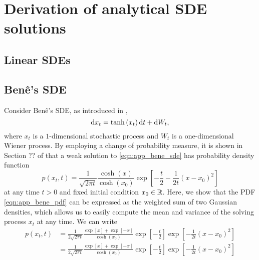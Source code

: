 \chapter{Derivation of analytical SDE solutions}



\section{Linear SDEs}\label{app:linear_sde_sols}


\section{Ben\^e's SDE}\label{app:bene_calculations}
Consider Ben\^e's SDE, as introduced in ,
\begin{equation}\label{eqn:app_bene_sde}
	\sde{x_t}{\tanh\left(x_t\right)}{},
\end{equation}
where \(x_t\) is a \(1\)-dimensional stochastic process and \(W_t\) is a one-dimensional Wiener process.
By employing a change of probability measure, it is shown in Section ?? of \citet{SarkkaSolin_2019_AppliedStochasticDifferential} that a weak solution to \eqref{eqn:app_bene_sde} has probability density function
\begin{equation}\label{eqn:app_bene_pdf}
	p\left(x_t, t\right) = \frac{1}{\sqrt{2\pi t}} \frac{\cosh\left(x\right)}{\cosh\left(x_0\right)}\exp\left[-\frac{t}{2} - \frac{1}{2t}\left(x - x_0\right)^2\right]
\end{equation}
at any time \(t > 0\) and fixed initial condition \(x_0 \in \mathbb{R}\).
Here, we show that the PDF \eqref{eqn:app_bene_pdf} can be expressed as the weighted sum of two Gaussian densities, which allows us to easily compute the mean and variance of the solving process \(x_t\) at any time.
We can write
\begin{align*}
	p\left(x_t, t\right) & = \frac{1}{2\sqrt{2\pi t}} \frac{\exp\left[x\right] + \exp\left[-x\right]}{\cosh\left(x_0\right)}\exp\left[-\frac{t}{2}\right]\exp\left[-\frac{1}{2t}\left(x - x_0\right)^2\right] \\
	                     & = \frac{1}{2\sqrt{2\pi t}} \frac{\exp\left[x\right] + \exp\left[-x\right]}{\cosh\left(x_0\right)}\exp\left[-\frac{t}{2}\right]\exp\left[-\frac{1}{2t}\left(x - x_0\right)^2\right] \\
\end{align*}
